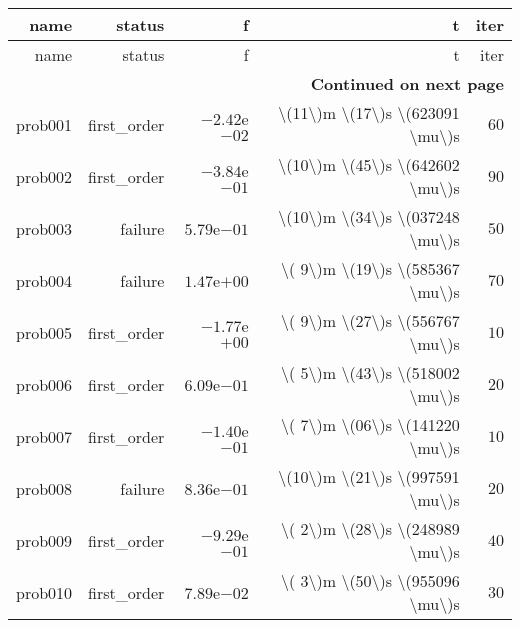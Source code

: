\documentclass[varwidth=20cm,crop=true]{standalone}
\begin{document}
\begin{longtable}{rrrrr}
  \hline
  name & status & f & t & iter \\\hline
  \endfirsthead
  \hline
  name & status & f & t & iter \\\hline
  \endhead
  \hline
  \multicolumn{5}{r}{{\bfseries Continued on next page}}\\
  \hline
  \endfoot
  \endlastfoot
  prob001 & first\_order & \(-2.42\)e\(-02\) & \textbackslash{}(11\textbackslash{})m \textbackslash{}(17\textbackslash{})s \textbackslash{}(623091 \textbackslash{}mu\textbackslash{})s & \(    60\) \\
  prob002 & first\_order & \(-3.84\)e\(-01\) & \textbackslash{}(10\textbackslash{})m \textbackslash{}(45\textbackslash{})s \textbackslash{}(642602 \textbackslash{}mu\textbackslash{})s & \(    90\) \\
  prob003 & failure & \( 5.79\)e\(-01\) & \textbackslash{}(10\textbackslash{})m \textbackslash{}(34\textbackslash{})s \textbackslash{}(037248 \textbackslash{}mu\textbackslash{})s & \(    50\) \\
  prob004 & failure & \( 1.47\)e\(+00\) & \textbackslash{}( 9\textbackslash{})m \textbackslash{}(19\textbackslash{})s \textbackslash{}(585367 \textbackslash{}mu\textbackslash{})s & \(    70\) \\
  prob005 & first\_order & \(-1.77\)e\(+00\) & \textbackslash{}( 9\textbackslash{})m \textbackslash{}(27\textbackslash{})s \textbackslash{}(556767 \textbackslash{}mu\textbackslash{})s & \(    10\) \\
  prob006 & first\_order & \( 6.09\)e\(-01\) & \textbackslash{}( 5\textbackslash{})m \textbackslash{}(43\textbackslash{})s \textbackslash{}(518002 \textbackslash{}mu\textbackslash{})s & \(    20\) \\
  prob007 & first\_order & \(-1.40\)e\(-01\) & \textbackslash{}( 7\textbackslash{})m \textbackslash{}(06\textbackslash{})s \textbackslash{}(141220 \textbackslash{}mu\textbackslash{})s & \(    10\) \\
  prob008 & failure & \( 8.36\)e\(-01\) & \textbackslash{}(10\textbackslash{})m \textbackslash{}(21\textbackslash{})s \textbackslash{}(997591 \textbackslash{}mu\textbackslash{})s & \(    20\) \\
  prob009 & first\_order & \(-9.29\)e\(-01\) & \textbackslash{}( 2\textbackslash{})m \textbackslash{}(28\textbackslash{})s \textbackslash{}(248989 \textbackslash{}mu\textbackslash{})s & \(    40\) \\
  prob010 & first\_order & \( 7.89\)e\(-02\) & \textbackslash{}( 3\textbackslash{})m \textbackslash{}(50\textbackslash{})s \textbackslash{}(955096 \textbackslash{}mu\textbackslash{})s & \(    30\) \\\hline
\end{longtable}
\end{document}
